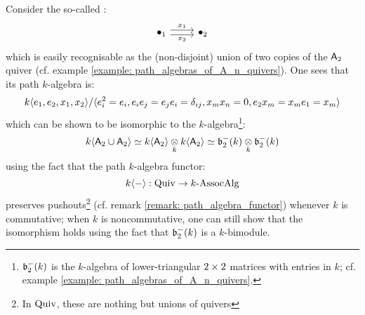            \begin{example}
                Consider the so-called :
                    $$
                        \begin{tikzcd}
                        	{\bullet_1} & {\bullet_2}
                        	\arrow["x_2"', shift right=1, from=1-1, to=1-2]
                        	\arrow["x_1", shift left=1, from=1-1, to=1-2]
                        \end{tikzcd}
                    $$
                which is easily recognisable as the (non-disjoint) union of two copies of the $\mathsf{A}_2$ quiver (cf. example \ref{example: path_algebras_of_A_n_quivers}). One sees that its path $k$-algebra is:
                    $$k\langle e_1, e_2, x_1, x_2\rangle/\langle e_i^2 = e_i, e_i e_j = e_j e_i = \delta_{ij}, x_m x_n = 0, e_2 x_m = x_m e_1 = x_m\rangle$$
                which can be shown to be isomorphic to the $k$-algebra\footnote{$\mathfrak{b}_2^-(k)$ is the $k$-algebra of lower-triangular $2 \x 2$ matrices with entries in $k$; cf. example \ref{example: path_algebras_of_A_n_quivers}.}:
                    $$k\<\sfA_2 \cup \sfA_2\> \cong k\<\sfA_2\> \tensor_k k\<\sfA_2\> \cong \b_2^-(k) \tensor_k \b_2^-(k)$$
                using the fact that the path $k$-algebra functor:
                    $$k\langle-\rangle: \mathrm{Quiv} \to k\text{-}\mathrm{Assoc}\mathrm{Alg}$$
                preserves pushouts\footnote{In $\mathrm{Quiv}$, these are nothing but unions of quivers} (cf. remark \ref{remark: path_algebra_functor}) whenever $k$ is commutative; when $k$ is noncommutative, one can still show that the isomorphism holds using the fact that $\mathfrak{b}_2^-(k)$ is a $k$-bimodule.
            \end{example}
